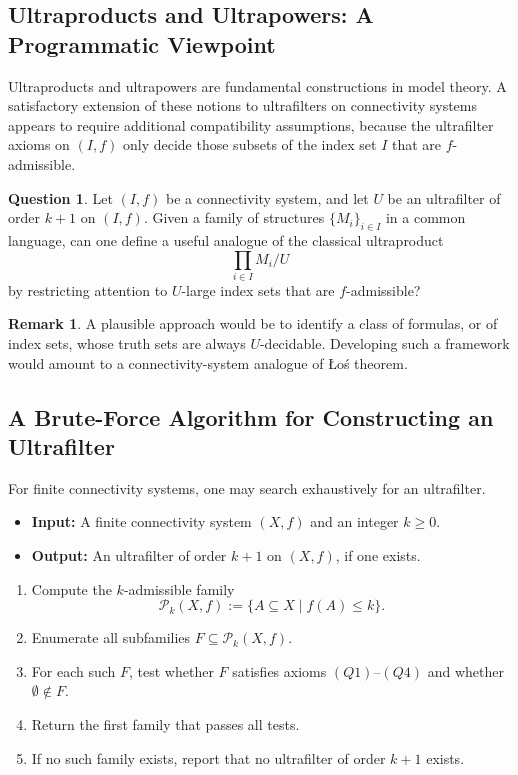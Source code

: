 \documentclass[10pt]{book}
\theoremstyle{definition}
\newtheorem{remark}[theorem]{Remark}
\newtheorem{question}[theorem]{Question}
\begin{document}
\subsection{Ultraproducts and Ultrapowers: A Programmatic Viewpoint}

Ultraproducts and ultrapowers are fundamental constructions in model theory.
A satisfactory extension of these notions to ultrafilters on connectivity systems appears to require additional compatibility assumptions, because the ultrafilter axioms on \((I,f)\) only decide those subsets of the index set \(I\) that are \(f\)-admissible.

\begin{question}
Let \((I,f)\) be a connectivity system, and let \(U\) be an ultrafilter of order \(k+1\) on \((I,f)\).
Given a family of structures \(\{M_i\}_{i\in I}\) in a common language, can one define a useful analogue of the classical ultraproduct
\[
\prod_{i\in I} M_i/U
\]
by restricting attention to \(U\)-large index sets that are \(f\)-admissible?
\end{question}

\begin{remark}
A plausible approach would be to identify a class of formulas, or of index sets, whose truth sets are always \(U\)-decidable.
Developing such a framework would amount to a connectivity-system analogue of \L o\'s theorem.
\end{remark}

\subsection{A Brute-Force Algorithm for Constructing an Ultrafilter}

For finite connectivity systems, one may search exhaustively for an ultrafilter.

\begin{algorithm}[H]
\caption{Exhaustive search for an ultrafilter on a finite connectivity system}
\begin{itemize}
    \item \textbf{Input:} A finite connectivity system \((X,f)\) and an integer \(k\ge 0\).
    \item \textbf{Output:} An ultrafilter of order \(k+1\) on \((X,f)\), if one exists.
\end{itemize}

\begin{enumerate}
    \item Compute the \(k\)-admissible family
    \[
    \mathcal{P}_k(X,f):=\{A\subseteq X\mid f(A)\le k\}.
    \]
    \item Enumerate all subfamilies \(F\subseteq \mathcal{P}_k(X,f)\).
    \item For each such \(F\), test whether \(F\) satisfies axioms \((Q1)\)--\((Q4)\) and whether \(\emptyset\notin F\).
    \item Return the first family that passes all tests.
    \item If no such family exists, report that no ultrafilter of order \(k+1\) exists.
\end{enumerate}
\end{algorithm}
\end{document}
